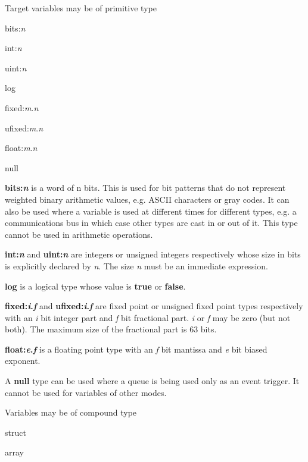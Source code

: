         Target variables may be of primitive type
        \blist
        \item    bits:{\em n}
        \item    int:{\em n}
        \item    uint:{\em n}
        \item    log
        \item    fixed:{\em m}.{\em n}
        \item    ufixed:{\em m}.{\em n}
        \item    float:{\em m}.{\em n}
        \item    null
        \blend

        {\bf bits:{\em n}} is a word of n bits. This is used for bit patterns that
        do not represent weighted binary arithmetic values, e.g. ASCII
        characters or gray codes. It can also be used where a variable is
        used at different times for different types, e.g. a communications
        bus in which case other types are cast in or out of it. This type
        cannot be used in arithmetic operations.

        {\bf int:{\em n}} and {\bf uint:{\em n}} are integers or unsigned
        integers respectively whose size in bits is explicitly
        declared by {\em n}. The size {\em n} must be an immediate expression.

        {\bf log} is a logical type whose value is {\bf true} or {\bf false}.

        {\bf fixed:{\em i}.{\em f}} and {\bf ufixed:{\em i}.{\em f}} are fixed
        point or unsigned fixed point types respectively with an {\em i} bit
        integer part and {\em f} bit fractional part. {\em i} or {\em f} may be
        zero (but not both). The maximum size of the fractional part is 63 bits.
        
        {\bf float:{\em e}.{\em f}} is a floating point type with an {\em f}
        bit mantissa and {\em e} bit biased exponent.

        A {\bf null} type can be used where a queue is being used only as an
        event trigger. It cannot be used for variables of other modes.

        Variables may be of compound type
        \blist
        \item   struct
        \item   array
        \blend

